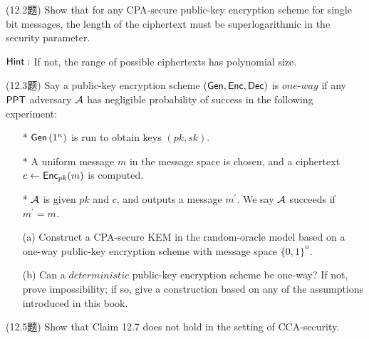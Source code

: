 \begin{questions}
    \question (12.2题) Show that for any CPA-secure public-key encryption scheme for single bit messages, the length of the ciphertext must be superlogarithmic in the security parameter.

        \begin{center}
            $\mathsf{Hint:}$ If not, the range of possible ciphertexts has polynomial size.
        \end{center}

        \begin{solution}
        \end{solution}

    \question (12.3题) Say a public-key encryption scheme $(\mathsf{Gen},\mathsf{Enc},\mathsf{Dec})$ is $one$-$way$ if any $\mathsf{PPT}$ adversary $\mathcal{A}$ has negligible probability of success in the following experiment:

        \begin{enumerate}
            \item[*] $\mathsf{Gen}\left(1^{n}\right)$ is run to obtain keys $(pk,sk)$.
            \item[*] A uniform message $m$ in the message space is chosen, and a ciphertext $c\leftarrow\mathsf{Enc}_{pk}(m)$ is computed.
            \item[*] $\mathcal{A}$ is given $pk$ and $c$, and outputs a message $m^{'}$. We say $\mathcal{A}$ succeeds if $m^{'}=m$.
        \end{enumerate}

        \begin{enumerate}
            \item[(a)] Construct a CPA-secure KEM in the random-oracle model based on a one-way public-key encryption scheme with message space $\{0,1\}^n$.
            \item[(b)] Can a $deterministic$ public-key encryption scheme be one-way? If not, prove impossibility; if so, give a construction based on any of the assumptions introduced in this book.
        \end{enumerate}

        \begin{solution}
        \end{solution}

    \question (12.5题) Show that Claim 12.7 does not hold in the setting of CCA-security.

        \begin{solution}
        \end{solution}


\end{questions}
